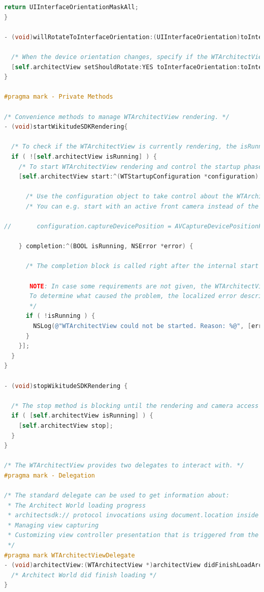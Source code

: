 \documentclass[thesis=M,english]{FITthesis}[2012/10/20]
\begin{document}
\begin{lstlisting}[language=C]
  return UIInterfaceOrientationMaskAll;
}

- (void)willRotateToInterfaceOrientation:(UIInterfaceOrientation)toInterfaceOrientation duration:(NSTimeInterval)duration {
  
  /* When the device orientation changes, specify if the WTArchitectView object should rotate as well */
  [self.architectView setShouldRotate:YES toInterfaceOrientation:toInterfaceOrientation];
}

#pragma mark - Private Methods

/* Convenience methods to manage WTArchitectView rendering. */
- (void)startWikitudeSDKRendering{
  
  /* To check if the WTArchitectView is currently rendering, the isRunning property can be used */
  if ( ![self.architectView isRunning] ) {
    /* To start WTArchitectView rendering and control the startup phase, the -start:completion method can be used */
    [self.architectView start:^(WTStartupConfiguration *configuration) {
      
      /* Use the configuration object to take control about the WTArchitectView startup phase */
      /* You can e.g. start with an active front camera instead of the default back camera */
      
//       configuration.captureDevicePosition = AVCaptureDevicePositionFront;
      
    } completion:^(BOOL isRunning, NSError *error) {
      
      /* The completion block is called right after the internal start method returns.
       
       NOTE: In case some requirements are not given, the WTArchitectView might not be started and returns NO for isRunning.
       To determine what caused the problem, the localized error description can be used.
       */
      if ( !isRunning ) {
        NSLog(@"WTArchitectView could not be started. Reason: %@", [error localizedDescription]);
      }
    }];
  }
}

- (void)stopWikitudeSDKRendering {
  
  /* The stop method is blocking until the rendering and camera access is stopped */
  if ( [self.architectView isRunning] ) {
    [self.architectView stop];
  }
}

/* The WTArchitectView provides two delegates to interact with. */
#pragma mark - Delegation

/* The standard delegate can be used to get information about:
 * The Architect World loading progress
 * architectsdk:// protocol invocations using document.location inside JavaScript
 * Managing view capturing
 * Customizing view controller presentation that is triggered from the WTArchitectView
 */
#pragma mark WTArchitectViewDelegate
- (void)architectView:(WTArchitectView *)architectView didFinishLoadArchitectWorldNavigation:(WTNavigation *)navigation {
  /* Architect World did finish loading */
}


\end{lstlisting}
\end{document}
